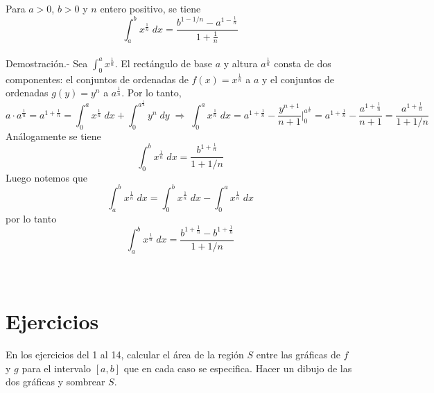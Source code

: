 \begin{teo} Para $a>0$, $b>0$ y $n$ entero positivo, se tiene $$\int_a^b x^{\frac{1}{n}} \; dx = \dfrac{b^{1-1/n} - a^{1-\frac{1}{n}}}{1+\frac{1}{n}}$$\\
    Demostración.-\; Sea $\int_0^a x^{\frac{1}{n}}$. El rectángulo de base $a$ y altura $a^{\frac{1}{n}}$ consta de dos componentes: el conjuntos de ordenadas de $f(x) = x^{\frac{1}{n}}$ a $a$ y el conjuntos de ordenadas $g(y) = y^n$ a $a^{\frac{1}{n}}$. Por lo tanto,
    $$a\cdot a^{\frac{1}{n}} = a^{1+\frac{1}{n}} = \int_0^a x^{\frac{1}{n}} \; dx + \int_0^{a^{\frac{1}{n}}} y^n \; dy \; \Longrightarrow \; \int_0^a x^{\frac{1}{n}} \; dx = a^{1+\frac{1}{n}} - \dfrac{y^{n+1}}{n+1}\bigg|_0^{a^{\frac{1}{n}}} = a^{1+\frac{1}{n}} -  \dfrac{a^{1+\frac{1}{n}}}{n+1} = \dfrac{a^{1+\frac{1}{n}}}{1 + 1/n}$$
    Análogamente se tiene $$\int_0^b x^{\frac{1}{n}}\; dx = \dfrac{b^{1 + \frac{1}{n}}}{1 + 1/n}$$
    Luego notemos que $$\int_a^b x^{\frac{1}{n}} \; dx = \int_0^b x^{\frac{1}{n}}\; dx - \int_0^a x^{\frac{1}{n}} \;dx$$
    por lo tanto $$\int_a^b x^{\frac{1}{n}}\; dx = \dfrac{b^{1+\frac{1}{n}} - b^{1 + \frac{1}{n}}}{1 + 1/n}$$\\\\
\end{teo}



\setcounter{section}{3}
\section{Ejercicios}

En los ejercicios del 1 al 14, calcular el área de la región $S$ entre las gráficas de $f$ y $g$ para el intervalo $[a,b]$ que en cada caso se especifica. Hacer un dibujo de las dos gráficas y sombrear $S$.\\

